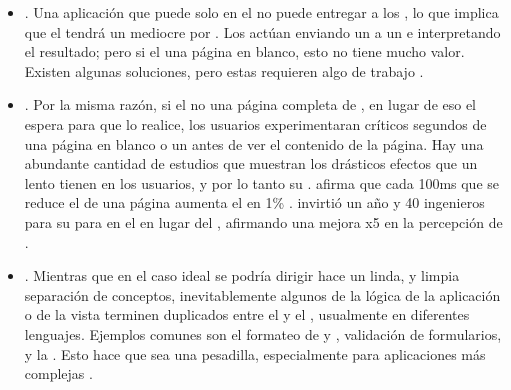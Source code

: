 \begin{itemize}
	\item
		\textbf{\seoINT}. Una aplicación que puede solo \runCPT en el \clientSideAS no puede entregar \htmlNAME a los \crawlersINT, lo que implica que el \webINT tendrá un \seoINT mediocre por . Los \crawlersINT actúan enviando un \requestINT a un \webserverINT e interpretando el resultado; pero si el \serverAS \responseINT una página en blanco, esto no tiene mucho valor. Existen algunas soluciones, pero estas requieren algo de trabajo \cite{online_problems_sing_page_app}.
	\item
		\textbf{\performanceQA}. Por la misma razón, si el \serverAS no \renderCPT una página completa de \htmlNAME, en lugar de eso el \clientSideAS espera para que \javaScriptNAME lo realice, los usuarios experimentaran críticos segundos de una página en blanco o un \loadingSpinnerCPT antes de ver el contenido de la página. Hay una abundante cantidad de estudios que muestran los drásticos efectos que un \siteINT lento tienen en los usuarios, y por lo tanto su \revenueQA \cite{online_fastView_web_perfor_opti_accele}. \amazonNAME afirma que cada 100ms que se reduce el \loadTimeCPT de una página aumenta el \revenueQA en 1\% \cite{kohavi2007online} \cite{online_psychology_web_performance}. \twitterNAME invirtió un año y 40 ingenieros para \rebuildingPL su \siteINT para \renderCPT en el \serverAS en lugar del \clientAS, afirmando una mejora x5 en la percepción de \loadingTimeCPT \cite{online_improving_web_performance_twitter}.
	\item
		\textbf{\maintainabilityQA}. Mientras que en el caso ideal se podría dirigir hace un linda, y limpia separación de conceptos, inevitablemente algunos \bitsPC de la lógica de la aplicación o de la vista terminen duplicados entre el \clientAS y el \serverAS, usualmente en diferentes lenguajes. Ejemplos comunes son el formateo de  \datePL y \currencyCPT, validación de formularios, y la \routingLogicAS. Esto hace que \maintenanceQA sea una pesadilla, especialmente para aplicaciones más complejas \cite{online_problems_sing_page_app}.

\end{itemize}

